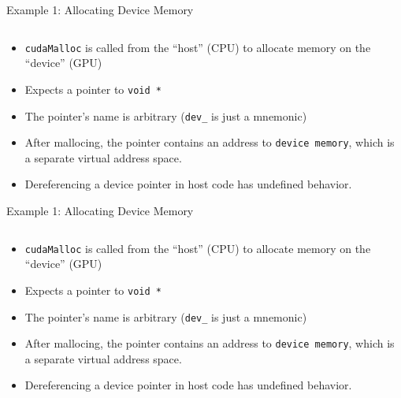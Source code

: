 \documentclass{beamer}
\begin{document}
    \begin{frame}{Example 1:  Allocating Device Memory}
        \begin{block}{}
            \inputminted[firstline=7,lastline=9]{cuda}{src/01_scalar_add.cu}
        \end{block}
        \begin{itemize}
            \item \texttt{cudaMalloc} is called from the ``host'' (CPU) to allocate memory on the ``device'' (GPU)
            \item Expects a pointer to \texttt{void *}
            \item The pointer's name is arbitrary (\texttt{dev\_} is just a mnemonic)
            \item After mallocing, the pointer contains an address to \texttt{device memory}, which is a separate virtual address space.
            \item Dereferencing a device pointer in host code has undefined behavior.
        \end{itemize}
    \end{frame}

    \begin{frame}{Example 1:  Allocating Device Memory}
        \begin{block}{}
            \inputminted[firstline=7,lastline=9]{cuda}{src/01_scalar_add.cu}
        \end{block}
        \begin{itemize}
            \item \texttt{cudaMalloc} is called from the ``host'' (CPU) to allocate memory on the ``device'' (GPU)
            \item Expects a pointer to \texttt{void *}
            \item The pointer's name is arbitrary (\texttt{dev\_} is just a mnemonic)
            \item After mallocing, the pointer contains an address to \texttt{device memory}, which is a separate virtual address space.
            \item Dereferencing a device pointer in host code has undefined behavior.
        \end{itemize}
    \end{frame}
\end{document}
